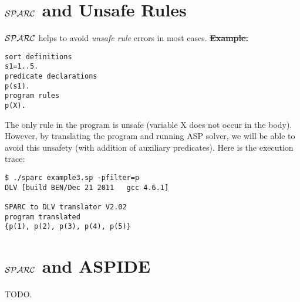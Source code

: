 \documentclass[12pt, letterpaper]{article}
\begin{document}
\section{${\cal SPARC}$ and Unsafe Rules}

${\cal SPARC}$ helps to avoid \textit{unsafe rule} errors in most  cases.
\st \textbf{Example.}
\begin{verbatim}
sort definitions
s1=1..5.
predicate declarations
p(s1).
program rules
p(X). 
\end{verbatim}
The only rule in the program is unsafe (variable X does not occur in the body).
However, by translating the program and running ASP solver, we will be able to avoid this unsafety 
(with addition of auxiliary predicates).
Here is the execution trace:
\begin{verbatim}
$ ./sparc example3.sp -pfilter=p 
DLV [build BEN/Dec 21 2011   gcc 4.6.1]

SPARC to DLV translator V2.02
program translated
{p(1), p(2), p(3), p(4), p(5)}
\end{verbatim}
\section{${\cal SPARC}$ and ASPIDE}
TODO. 
\end{document}
